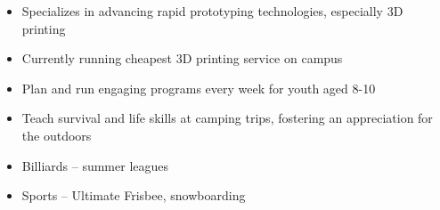 \documentclass{resume}
\begin{document}
\begin{itemize}
	\item Specializes in advancing rapid prototyping technologies, especially 3D printing
	\item Currently running cheapest 3D printing service on campus
\end{itemize}


\VolunteerWorkExperience

\begin{itemize}
	\item Plan and run engaging programs every week for youth aged 8-10
	\item Teach survival and life skills at camping trips, fostering an appreciation for the outdoors
\end{itemize}

\Education


\Interests

\begin{itemize}
	\item Billiards -- summer leagues
	\item Sports -- Ultimate Frisbee, snowboarding
\end{itemize}
\end{document}
